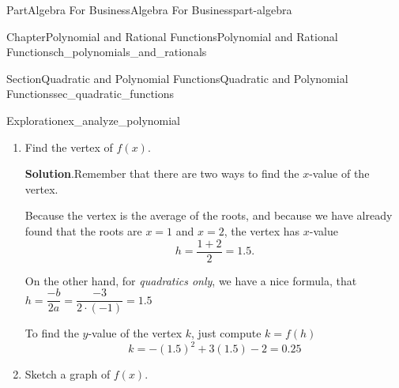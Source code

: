 \documentclass[oneside,10pt,]{tufte-book}
\newcommand{\blocktitlefont}{\relax}
\numberwithin{equation}{chapter}
\begin{document}
\begin{partptx}{Part}{Algebra For Business}{}{Algebra For Business}{}{}{part-algebra}
\begin{chapterptx}{Chapter}{Polynomial and Rational Functions}{}{Polynomial and Rational Functions}{}{}{ch_polynomials_and_rationals}
\begin{sectionptx}{Section}{Quadratic and Polynomial Functions}{}{Quadratic and Polynomial Functions}{}{}{sec_quadratic_functions}
\begin{exploration}{Exploration}{}{ex_analyze_polynomial}
\begin{enumerate}[font=\bfseries,label=(\alph*),ref=\alph*]
\begin{equation*}
(-1)\cdot \Big(\frac{-1}{-1}x^2 + \frac{3}{-1}x -\frac{2}{-1}\Big) = 0 
\end{equation*}
Essentially, we are "un-distributing" the leading term of \(-1\).  Simplifying the equation down, we now get%
\begin{equation*}
(-1)\cdot \Big(x^2 -3 x +2 \Big) = 0 
\end{equation*}
Now we can factor the quadratic inside.  We want to find some numbers \(d_1,d_2\) such that%
\begin{equation*}
x^2 - 3x + 2 = (x+d_1)(x+d_2) = x^2 + (d_1+d_2)x + d_1\cdot d_2\text{.}
\end{equation*}
In other words, we want numbers that add to \(-3\) and multiply to positive \(2\).  Trying \(d_1=-1\) and \(d_2=-2\), we get \(-1+-2=-3\) and \((-1)(-2)=2\) as desired.  That means we can rewrite our original equation as%
\begin{equation*}
(-1)\cdot \Big(x-1\Big)\Big(x-2\Big) = 0 
\end{equation*}
But the product of two numbers can only equal zero if the individual numbers are zero.  That means that the equation is equivalent to \emph{either} having \(x-1=0\) \emph{or} having \(x-2=0\).%
\par
In other words, this is equivalent to having \(x=1\) or \(x=2\), which are the two \(x\)-intercepts of our quadratic.%
\item{}Find the vertex of \(f(x)\).%
\par\smallskip%
\noindent\textbf{\blocktitlefont Solution}.\hypertarget{ex_analyze_polynomial-3-2}{}\quad{}Remember that there  are two ways to find the \(x\)-value of the vertex.%
\par
Because the vertex is the average of the roots, and because we have already found that the roots are \(x=1\) and \(x=2\), the vertex has \(x\)-value%
\begin{equation*}
h=\dfrac{1+2}{2} = 1.5\text{.}
\end{equation*}
%
\par
On the other hand, for \emph{quadratics only}, we have a nice formula, that \(h=\dfrac{-b}{2a} = \dfrac{-3}{2\cdot (-1)}= 1.5\)%
\par
To find the \(y\)-value of the vertex \(k\), just compute \(k = f(h) \)%
\begin{equation*}
k = -(1.5)^2 + 3(1.5) - 2 = 0.25
\end{equation*}
%
\item{}Sketch a graph of \(f(x)\).%

\end{enumerate}
\end{exploration}
\end{sectionptx}
\end{chapterptx}
\end{partptx}
\end{document}
